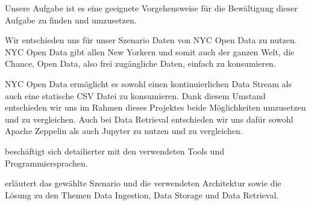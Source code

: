 Unsere Aufgabe ist es eine geeignete Vorgehensweise für die Bewältigung dieser Aufgabe zu finden und umzusetzen.

Wir entschieden uns für unser Szenario Daten von NYC Open Data zu nutzen.\\
NYC Open Data gibt allen \glqq New Yorkern\grqq{} und somit auch der ganzen Welt, die Chance, Open Data, also frei zugängliche Daten,
einfach zu konsumieren.\autocite{NYCOpenData}

NYC Open Data ermöglicht es sowohl einen kontinuierlichen Data Stream als auch eine statische \ac{CSV} Datei zu konsumieren.
Dank diesem Umstand entschieden wir uns im Rahmen dieses Projektes beide Möglichkeiten umzusetzen und zu vergleichen.
Auch bei Data Retrieval entschieden wir uns dafür sowohl Apache Zeppelin als auch Jupyter zu nutzen und zu vergleichen.

 beschäftigt sich detailierter mit den verwendeten Tools und Programmiersprachen.

 erläutert das gewählte Szenario und die verwendeten Architektur sowie die Lösung zu den Themen Data Ingestion, Data Storage und Data Retrieval.
